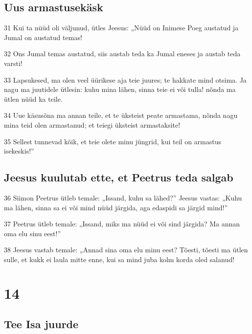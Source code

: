 \section*{Uus armastusekäsk}

\par 31 Kui ta nüüd oli väljunud, ütles Jeesus: „Nüüd on Inimese Poeg austatud ja Jumal on austatud temas!
\par 32 Ons Jumal temas austatud, siis austab teda ka Jumal eneses ja austab teda varsti!
\par 33 Lapsukesed, ma olen veel üürikese aja teie juures; te hakkate mind otsima. Ja nagu ma juutidele ütlesin: kuhu mina lähen, sinna teie ei või tulla! nõnda ma ütlen nüüd ka teile.
\par 34 Uue käsusõna ma annan teile, et te üksteist peate armastama, nõnda nagu mina teid olen armastanud; et teiegi üksteist armastaksite!
\par 35 Sellest tunnevad kõik, et teie olete minu jüngrid, kui teil on armastus isekeskis!”

\section*{Jeesus kuulutab ette, et Peetrus teda salgab}

\par 36 Siimon Peetrus ütleb temale: „Issand, kuhu sa lähed?” Jeesus vastas: „Kuhu ma lähen, sinna sa ei või mind nüüd järgida, aga edaspidi sa järgid mind!”
\par 37 Peetrus ütleb temale: „Issand, miks ma nüüd ei või sind järgida? Ma annan oma elu sinu eest!”
\par 38 Jeesus vastab temale: „Annad sina oma elu minu eest? Tõesti, tõesti ma ütlen sulle, et kukk ei laula mitte enne, kui sa mind juba kolm korda oled salanud!


\chapter{14}

\section*{Tee Isa juurde}

